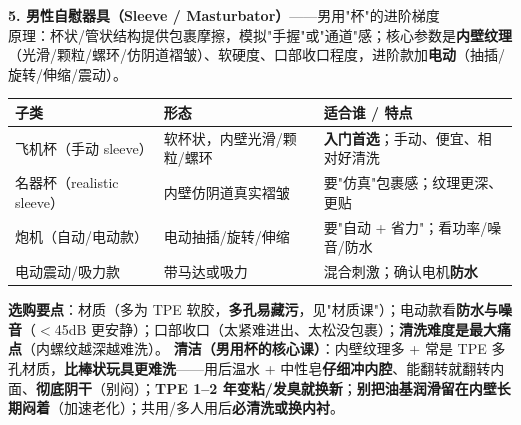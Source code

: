 \documentclass[12pt,UTF8,openany]{ctexbook}
\begin{document}
\textbf{5. 男性自慰器具（Sleeve / Masturbator）}——男用"杯"的进阶梯度\\
原理：杯状/管状结构提供包裹摩擦，模拟"手握"或"通道"感；核心参数是\textbf{内壁纹理}（光滑/颗粒/螺环/仿阴道褶皱）、软硬度、口部收口程度，进阶款加\textbf{电动}（抽插/旋转/伸缩/震动）。
\begin{tabularx}{\textwidth}{l X X}
\toprule
\textbf{子类} & \textbf{形态} & \textbf{适合谁 / 特点} \\
\midrule
飞机杯（手动 sleeve） & 软杯状，内壁光滑/颗粒/螺环 & \textbf{入门首选}；手动、便宜、相对好清洗 \\
名器杯（realistic sleeve） & 内壁仿阴道真实褶皱 & 要"仿真"包裹感；纹理更深、更贴 \\
炮机（自动/电动款） & 电动抽插/旋转/伸缩 & 要"自动 + 省力"；看功率/噪音/防水 \\
电动震动/吸力款 & 带马达或吸力 & 混合刺激；确认电机\textbf{防水} \\
\bottomrule
\end{tabularx}
\par\smallskip
\textbf{选购要点}：材质（多为 TPE 软胶，\textbf{多孔易藏污}，见"材质课"）；电动款看\textbf{防水与噪音}（$<$45dB 更安静）；口部收口（太紧难进出、太松没包裹）；\textbf{清洗难度是最大痛点}（内螺纹越深越难洗）。
\textbf{清洁（男用杯的核心课）}：内壁纹理多 + 常是 TPE 多孔材质，\textbf{比棒状玩具更难洗}——用后温水 + 中性皂\textbf{仔细冲内腔}、能翻转就翻转内面、\textbf{彻底阴干}（别闷）；\textbf{TPE 1--2 年变粘/发臭就换新}；\textbf{别把油基润滑留在内壁长期闷着}（加速老化）；共用/多人用后\textbf{必清洗或换内衬}。
\end{document}
